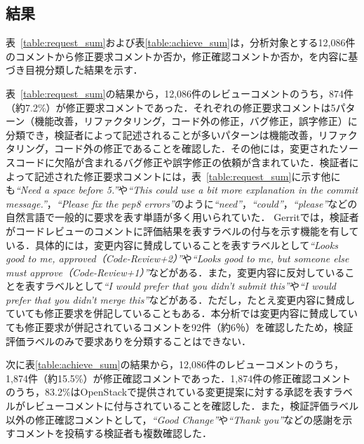 \documentclass[submit,techrep,noauthor]{ipsj}
\begin{document}
\subsection{結果}

表~\ref{table:request_sum}および表\ref{table:achieve_sum}は，分析対象とする12,086件のコメントから修正要求コメントか否か，修正確認コメントか否か，を内容に基づき目視分類した結果を示す．

表~\ref{table:request_sum}の結果から，12,086件のレビューコメントのうち，874件（約7.2\%）が修正要求コメントであった．それぞれの修正要求コメントは5パターン（機能改善，リファクタリング，コード外の修正，バグ修正，誤字修正）に分類でき，検証者によって記述されることが多いパターンは機能改善，リファクタリング，コード外の修正であることを確認した．その他には，変更されたソースコードに欠陥が含まれるバグ修正や誤字修正の依頼が含まれていた．検証者によって記述された修正要求コメントには，表~\ref{table:request_sum}に示す他にも\textit{``Need a space before 5.''}や\textit{``This could use a bit more explanation in the commit message.''}，\textit{``Please fix the pep8 errors''}のように\textit{``need''}，\textit{``could''}，\textit{``please''}などの自然言語で一般的に要求を表す単語が多く用いられていた．
Gerritでは，検証者がコードレビューのコメントに評価結果を表すラベルの付与を示す機能を有している．具体的には，変更内容に賛成していることを表すラベルとして\textit{``Looks good to me, approved（Code-Review+2）''}や\textit{``Looks good to me, but someone else must approve（Code-Review+1）''}などがある．また，変更内容に反対していることを表すラベルとして\textit{``I would prefer that you didn't submit this''}や\textit{``I would prefer that you didn't merge this''}などがある．ただし，たとえ変更内容に賛成していても修正要求を併記していることもある．本分析では変更内容に賛成していても修正要求が併記されているコメントを92件（約6％）を確認したため，検証評価ラベルのみで要求ありを分類することはできない．

次に表\ref{table:achieve_sum}の結果から，12,086件のレビューコメントのうち，1,874件（約15.5\%）が修正確認コメントであった．1,874件の修正確認コメントのうち，83.2\%はOpenStackで提供されている変更提案に対する承認を表すラベルがレビューコメントに付与されていることを確認した．また，検証評価ラベル以外の修正確認コメントとして，\textit{``Good Change''}や\textit{``Thank you''}などの感謝を示すコメントを投稿する検証者も複数確認した．

\end{document}
